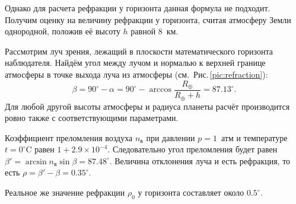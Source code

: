 Однако для расчета рефракции у горизонта данная формула не подходит. Получим оценку на величину рефракции у горизонта, считая атмосферу Земли однородной, положив её высоту $h$ равной 8~км. 

Рассмотрим луч зрения, лежащий в плоскости математического горизонта наблюдателя. Найдём угол между лучом и нормалью к верхней границе атмосферы в точке выхода луча из атмосферы (см.~Рис.\,\ref{pic:refraction}):
\begin{equation*}
	\beta = 90^\circ - \alpha = 90^\circ - \arccos \frac{R_\oplus}{R_\oplus + h} = 87.13^\circ.
\end{equation*}
Для любой другой высоты атмосферы и радиуса планеты расчёт производится ровно также с соответствующими параметрами.

Коэффициент преломления воздуха $n_\text{в}$ при давлении $p = 1$~атм и температуре $t=0^\circ\text{C}$ равен $1 + 2.9\times 10^{-4}$. Следовательно угол преломления будет равен $\beta' = \arcsin n_\text{в} \sin \beta = 87.48^\circ$. Величина отклонения луча и есть рефракция, то есть $\rho = \beta' - \beta = 0.35^\circ$.

Реальное же значение рефракции $\rho_0$ у горизонта составляет около $0.5^\circ$.


